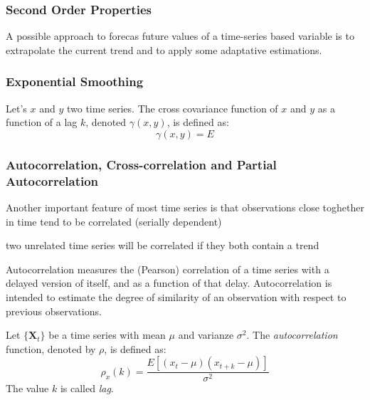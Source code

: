 \subsubsection{Second Order Properties}

A possible approach to forecas future values of a time-series based variable is to extrapolate the current trend and to apply some adaptative estimations.


\subsubsection{Exponential Smoothing}

\begin{definition}
Let's $x$ and $y$ two time series. The cross covariance function of $x$ and $y$ as a function of a lag $k$, denoted $\gamma \left( x, y \right)$, is defined as:
\[
    \gamma \left( x, y \right) = E 
\] 

\end{definition}

\begin{definition}

\end{definition}

%
% 
\subsubsection{Autocorrelation, Cross-correlation and Partial Autocorrelation}
\label{sub:autocorrelation}

{\color{red} Another important feature of most time series is that observations close toghether in time tend to be correlated (serially dependent)}

{\color{red} two unrelated time series will be correlated if they both contain a trend}

Autocorrelation measures the (Pearson) correlation of a time series with a delayed version of itself, and as a function of that delay. Autocorrelation is intended to estimate the degree of similarity of an observation with respect to previous observations.

\begin{definition}
Let $\{\mathbf{X}_t\}$ be a time series with mean $\mu$ and varianze $\sigma^2$. The \emph{autocorrelation} function, denoted by $\rho$, is defined as:
\[
\rho_x(k) = \frac{E\left[\left(x_{t}-\mu\right)\left(x_{t+k}-\mu\right)\right]}{\sigma^{2}}
\]
The value $k$ is called \emph{lag}.
\end{definition}

